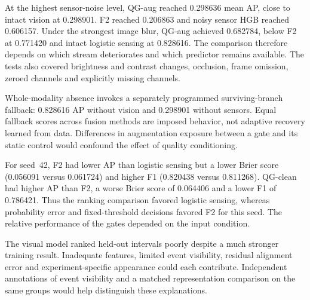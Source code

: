 At the highest sensor-noise level, QG-aug reached 0.298636 mean AP, close to intact vision at 0.298901. F2 reached 0.206863 and noisy sensor HGB reached 0.606157. Under the strongest image blur, QG-aug achieved 0.682784, below F2 at 0.771420 and intact logistic sensing at 0.828616. The comparison therefore depends on which stream deteriorates and which predictor remains available. The tests also covered brightness and contrast changes, occlusion, frame omission, zeroed channels and explicitly missing channels.

Whole-modality absence invokes a separately programmed surviving-branch fallback: 0.828616 AP without vision and 0.298901 without sensors. Equal fallback scores across fusion methods are imposed behavior, not adaptive recovery learned from data. Differences in augmentation exposure between a gate and its static control would confound the effect of quality conditioning.

For seed~42, F2 had lower AP than logistic sensing but a lower Brier score (0.056091 versus 0.061724) and higher F1 (0.820438 versus 0.811268). QG-clean had higher AP than F2, a worse Brier score of 0.064406 and a lower F1 of 0.786421. Thus the ranking comparison favored logistic sensing, whereas probability error and fixed-threshold decisions favored F2 for this seed. The relative performance of the gates depended on the input condition.

The visual model ranked held-out intervals poorly despite a much stronger training result. Inadequate features, limited event visibility, residual alignment error and experiment-specific appearance could each contribute. Independent annotations of event visibility and a matched representation comparison on the same groups would help distinguish these explanations.
